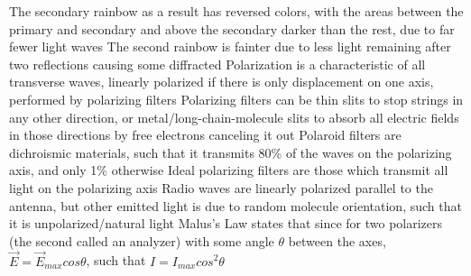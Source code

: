 \documentclass[11 pt, twoside]{article}
\newenvironment{outline*}
{
	\begin{outline}[enumerate]
	}
	{\end{outline}
}
\begin{document}
\begin{outline*}
\2 The secondary rainbow as a result has reversed colors, with the areas between the primary and secondary and above the secondary darker than the rest, due to far fewer light waves
\3 The second rainbow is fainter due to less light remaining after two reflections causing some diffracted
\1 Polarization is a characteristic of all transverse waves, linearly polarized if there is only displacement on one axis, performed by polarizing filters
\2 Polarizing filters can be thin slits to stop strings in any other direction, or metal/long-chain-molecule slits to absorb all electric fields in those directions by free electrons canceling it out
\3 Polaroid filters are dichroismic materials, such that it transmits 80\% of the waves on the polarizing axis, and only 1\% otherwise
\3 Ideal polarizing filters are those which transmit all light on the polarizing axis
\2 Radio waves are linearly polarized parallel to the antenna, but other emitted light is due to random molecule orientation, such that it is unpolarized/natural light
\2 Malus's Law states that since for two polarizers (the second called an analyzer) with some angle $\theta$ between the axes, $\vec{E} = \vec{E}_{max}cos\theta$, such that $I = I_{max}cos^2\theta$
\2 
\end{outline*}
\end{document}
